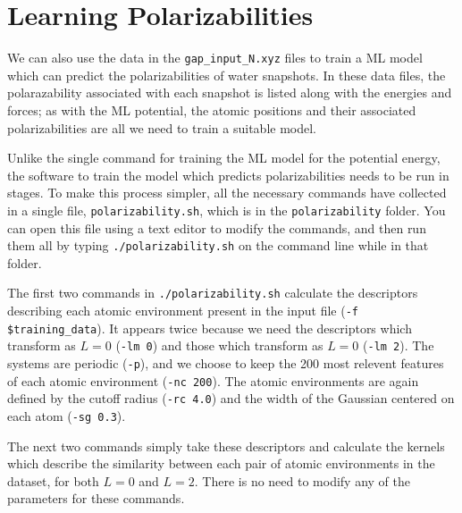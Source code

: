\documentclass{article}
\begin{document}
\section{Learning Polarizabilities}

We can also use the data in the \verb|gap_input_N.xyz| files to train a ML model which can predict the polarizabilities of water snapshots. In these data files, the polarazability associated with each snapshot is listed along with the energies and forces; as with the ML potential, the atomic positions and their associated polarizabilities are all we need to train a suitable model.

Unlike the single command for training the ML model for the potential energy, the software to train the model which predicts polarizabilities needs to be run in stages. To make this process simpler, all the necessary commands have collected in a single file, \verb|polarizability.sh|, which is in the \verb|polarizability| folder. You can open this file using a text editor to modify the commands, and then run them all by typing \verb|./polarizability.sh| on the command line while in that folder.


The first two commands in \verb|./polarizability.sh| calculate the descriptors describing each atomic environment present in the input file (\verb|-f $training_data|). It appears twice because we need the descriptors which transform as $L=0$ (\verb|-lm 0|) and those which transform as $L=0$ (\verb|-lm 2|). The systems are periodic (\verb|-p|), and we choose to keep the 200 most relevent features of each atomic environment (\verb|-nc 200|). The atomic environments are again defined by the cutoff radius (\verb|-rc 4.0|) and the width of the Gaussian centered on each atom (\verb|-sg 0.3|).

The next two commands simply take these descriptors and calculate the kernels which describe the similarity between each pair of atomic environments in the dataset, for both $L=0$ and $L=2$. There is no need to modify any of the parameters for these commands.
\end{document}
